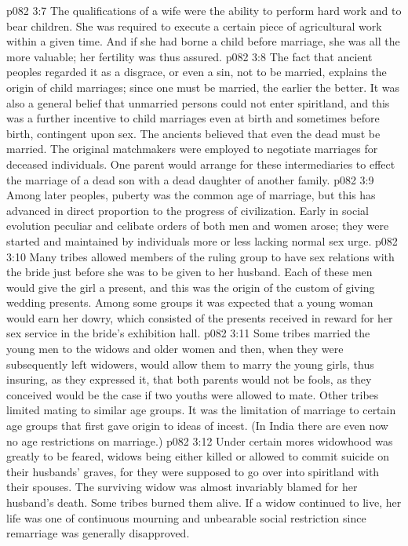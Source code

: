 \vs p082 3:7 The qualifications of a wife were the ability to perform hard work and to bear children. She was required to execute a certain piece of agricultural work within a given time. And if she had borne a child before marriage, she was all the more valuable; her fertility was thus assured.
\vs p082 3:8 \pc The fact that ancient peoples regarded it as a disgrace, or even a sin, not to be married, explains the origin of child marriages; since one must be married, the earlier the better. It was also a general belief that unmarried persons could not enter spiritland, and this was a further incentive to child marriages even at birth and sometimes before birth, contingent upon sex. The ancients believed that even the dead must be married. The original matchmakers were employed to negotiate marriages for deceased individuals. One parent would arrange for these intermediaries to effect the marriage of a dead son with a dead daughter of another family.
\vs p082 3:9 Among later peoples, puberty was the common age of marriage, but this has advanced in direct proportion to the progress of civilization. Early in social evolution peculiar and celibate orders of both men and women arose; they were started and maintained by individuals more or less lacking normal sex urge.
\vs p082 3:10 Many tribes allowed members of the ruling group to have sex relations with the bride just before she was to be given to her husband. Each of these men would give the girl a present, and this was the origin of the custom of giving wedding presents. Among some groups it was expected that a young woman would earn her dowry, which consisted of the presents received in reward for her sex service in the bride’s exhibition hall.
\vs p082 3:11 Some tribes married the young men to the widows and older women and then, when they were subsequently left widowers, would allow them to marry the young girls, thus insuring, as they expressed it, that both parents would not be fools, as they conceived would be the case if two youths were allowed to mate. Other tribes limited mating to similar age groups. It was the limitation of marriage to certain age groups that first gave origin to ideas of incest. (In India there are even now no age restrictions on marriage.)
\vs p082 3:12 \pc Under certain mores widowhood was greatly to be feared, widows being either killed or allowed to commit suicide on their husbands’ graves, for they were supposed to go over into spiritland with their spouses. The surviving widow was almost invariably blamed for her husband’s death. Some tribes burned them alive. If a widow continued to live, her life was one of continuous mourning and unbearable social restriction since remarriage was generally disapproved.
